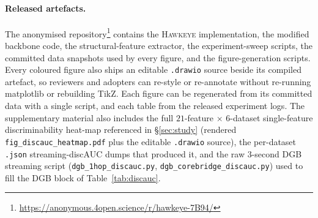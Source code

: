 \documentclass[sigconf,nonacm,review]{acmart}
\newcommand{\method}{\textsc{Hawkeye}\xspace}
\begin{document}
\paragraph{Released artefacts.}
The anonymised repository\footnote{\url{https://anonymous.4open.science/r/hawkeye-7B94/}}
contains the \method implementation, the modified backbone code, the
structural-feature extractor, the experiment-sweep scripts, the committed
data snapshots used by every figure, and the figure-generation scripts.
Every coloured figure also ships an editable \texttt{.drawio} source
beside its compiled artefact, so reviewers and adopters can re-style
or re-annotate without re-running matplotlib or rebuilding TikZ. Each
figure can be regenerated from its committed data with a single script,
and each table from the released experiment logs. The supplementary
material also includes the full $21$-feature $\times$ $6$-dataset
single-feature discriminability heat-map referenced in
\S\ref{sec:study} (rendered \texttt{fig\_discauc\_heatmap.pdf} plus the
editable \texttt{.drawio} source), the per-dataset \texttt{.json}
streaming-discAUC dumps that produced it, and the raw 3-second DGB
streaming script (\texttt{dgb\_1hop\_discauc.py},
\texttt{dgb\_corebridge\_discauc.py}) used to fill the DGB block of
Table~\ref{tab:discauc}.
\end{document}
